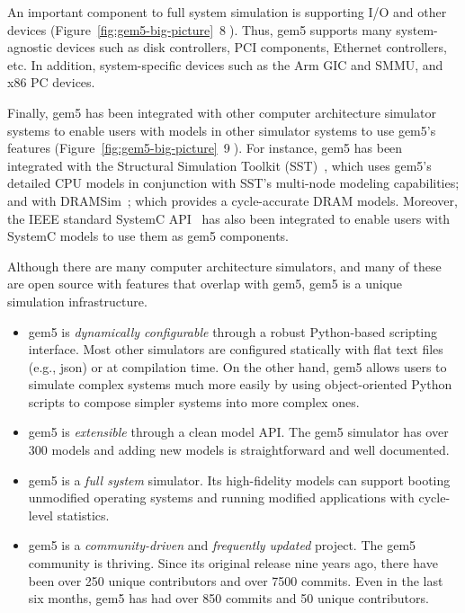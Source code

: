 An important component to full system simulation is supporting I/O and other devices (Figure~\ref{fig:gem5-big-picture}~\textcircled{8}).
Thus, gem5 supports many system-agnostic devices such as disk controllers, PCI components, Ethernet controllers, etc. In addition, system-specific devices such as the Arm GIC and SMMU, and x86 PC devices.


Finally, gem5 has been integrated with other computer architecture simulator systems to enable users with models in other simulator systems to use gem5's features (Figure~\ref{fig:gem5-big-picture}~\textcircled{9}).
For instance, gem5 has been integrated with the Structural Simulation Toolkit (SST)~\cite{RodriguesHemmert2011-sst, HsiehPedretti2012-sst-gem5}, which uses gem5's detailed CPU models in conjunction with SST's multi-node modeling capabilities; and with DRAMSim~\cite{wang_05, dramsim2, dramsim3}; which provides a cycle-accurate DRAM models. Moreover, the IEEE standard SystemC API~\cite{menard2017-system-systemc} has also been integrated to enable users with SystemC models to use them as gem5 components.

Although there are many computer architecture simulators, and many of these are open source with features that overlap with gem5, gem5 is a unique simulation infrastructure.
\begin{itemize}
    \item gem5 is \emph{dynamically configurable} through a robust Python-based scripting interface. Most other simulators are configured statically with flat text files (e.g., json) or at compilation time. On the other hand, gem5 allows users to simulate complex systems much more easily by using object-oriented Python scripts to compose simpler systems into more complex ones.
    \item gem5 is \emph{extensible} through a clean model API. The gem5 simulator has over 300 models and adding new models is straightforward and well documented.
    \item gem5 is a \emph{full system} simulator. Its high-fidelity models can support booting unmodified operating systems and running modified applications with cycle-level statistics.
    \item gem5 is a \emph{community-driven} and \emph{frequently updated} project. The gem5 community is thriving. Since its original release nine years ago, there have been over 250 unique contributors and over 7500 commits. Even in the last six months, gem5 has had over 850 commits and 50 unique contributors.
\end{itemize}

